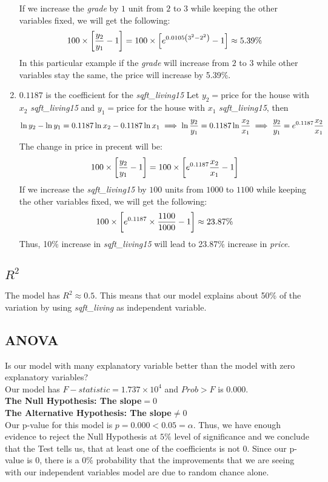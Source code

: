\documentclass[10pt]{article}
\begin{document}
\begin{enumerate}
If we increase the {\it grade} by $1$ unit from $2$ to $3$ while keeping the other variables fixed, we will get the following:
$$
\large 
100 \times \left[\frac{y_2}{y_1} -1  \right] = 100 \times \left[ e^{0.0105\left( 3^{2} - 2^{2}\right)} - 1 \right]\approx 5.39\%
$$
In this particular example if the {\it grade} will increase from $2$ to $3$ while other variables stay the same, the price will increase by 5.39\%.
 \item $0.1187$ is the coefficient for the {\it sqft\_living15}
Let $y_2 = \text{price}$ for the house with $x_2$ {\it sqft\_living15} and $y_1 = \text{price}$ for the house with $x_1$ {\it sqft\_living15}, then 
$$
\large
\ln y_2 - \ln y_1 = 0.1187 \ln x_2 - 0.1187 \ln x_1 \implies \ln \frac{y_2}{y_1} = 0.1187 \ln \frac{x_2}{x_1} \implies \frac{y_2}{y_1} = e^{0.1187}\frac{x_2}{x_1}
$$
The change in price in precent will be:
$$
\large
100 \times \left[\frac{y_2}{y_1} - 1 \right]= 100 \times \left[ e^{0.1187}\frac{x_2}{x_1} - 1 \right]
$$
If we increase the {\it sqft\_living15} by $100$ units from $1000$ to $1100$ while keeping the other variables fixed, we will get the following:
$$
\large
100 \times \left[ e^{0.1187}\times \frac{1100}{1000} - 1 \right] \approx 23.87\%
$$
Thus, 10\% increase in {\it sqft\_living15} will lead to 23.87\% increase in {\it price}.
 \end{enumerate}
\subsection*{\textbf{\(R^2 \)}}
The model has \(R^2\approx 0.5\).  This means that our model explains about 50\% of the variation by using {\it sqft\_living} as independent variable.
\subsection*{ANOVA}
Is our model with many explanatory variable better than the model with zero explanatory variables?\\
Our model has \(F-statistic = 1.737\times 10^4\)  and \(Prob > F\) is \(0.000\).\\
\textbf{The Null Hypothesis:   The slope\(=0\)\\
The Alternative Hypothesis: The slope\(\ne 0\)\\
}
Our p-value for this model is \(p=0.000 < 0.05 = \alpha\). Thus, we have enough evidence to reject the Null Hypothesis at $5\%$ level of significance and we conclude that the Test  tells us, that at least one of the coefficients is not $0$. Since our p-value is $0$, there is a $0\%$ probability that the improvements that we are seeing with our independent variables model are due to random chance alone.\textbf{}
\end{document}
